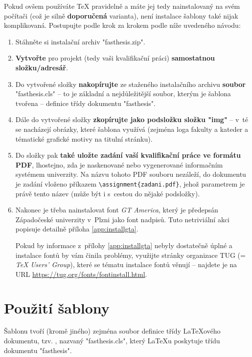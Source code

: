 \documentclass[czech, ma, kiv, he, iso690alph, pdf, viewonly]{fasthesis}
\begin{document}
Pokud ovšem používáte \TeX{} pravidelně a máte jej tedy nainstalovaný na svém počítači (což je silně \textbf{doporučená} varianta), není instalace šablony také nijak komplikovaná. Postupujte podle krok za krokem podle níže uvedeného návodu:
\begin{enumerate}
\item Stáhněte si instalační archiv \filename"fasthesis.zip".
\item \textbf{Vytvořte} pro projekt (tedy vaši kvalifikační práci) \textbf{samostatnou složku/adresář}.
\item Do vytvořené složky \textbf{nakopírujte} ze staženého instalačního archivu \textbf{soubor} \filename"fasthesis.cls" -- to je základní a nejdůležitější soubor, kterým je šablona tvořena -- definice třídy dokumentu \filename"fasthesis".
\item Dále do vytvořené složky \textbf{zkopírujte jako podsložku složku \filename"img"} -- v~té se nacházejí obrázky, které šablona využívá (zejména loga fakulty a kateder a tématické grafické motivy na titulní stránku).
\item Do složky pak \textbf{také uložte zadání vaší kvalifikační práce ve formátu PDF}, lhostejno, zda je naskenované nebo vygenerované informačním systémem univerzity. Na názvu tohoto PDF souboru nezáleží, do dokumentu je zadání vloženo příkazem \verb"\assignment{zadani.pdf}", jehož parametrem je právě tento název (může být i s~cestou do nějaké podsložky).
\item Nakonec je třeba nainstalovat font \emph{GT America}, který je předepsán  Západočeské univerzity v~Plzni jako font nadpisů. Tuto netriviální akci popisuje detailně příloha \ref{app:installgta}.

Pokud by informace z~přílohy \ref{app:installgta} nebyly dostatečně úplné a instalace fontů by vám činila problémy, využijte stránky organizace TUG (= \textit{\TeX{} Users' Group}), které se tématu instalace fontů věnují -- najdete je na URL \url{https://tug.org/fonts/fontinstall.html}.
\end{enumerate}
%
%
%
%
\chapter{Použití šablony}
Šablonu tvoří (kromě jiného) zejména soubor definice třídy \LaTeX{}ového dokumentu, tzv. , nazvaný \filename"fasthesis.cls", který \LaTeX{}u poskytuje třídu dokumentu \filename"fasthesis".
\end{document}
